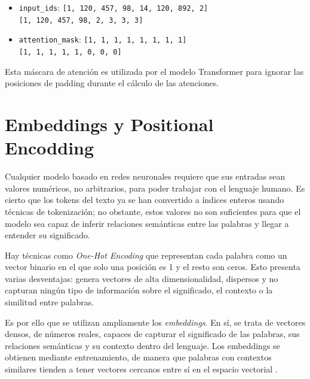 \documentclass[11pt]{book}
\begin{document}
\begin{itemize}
    \item \texttt{input\_ids}: \texttt{[1, 120, 457, 98, 14, 120, 892, 2]} \\
    \texttt{[1, 120, 457, 98, 2, 3, 3, 3]}
    \item \texttt{attention\_mask}: \texttt{[1, 1, 1, 1, 1, 1, 1, 1]} \\
    \texttt{[1, 1, 1, 1, 1, 0, 0, 0]}
\end{itemize}

Esta máscara de atención es utilizada por el modelo Transformer para ignorar las posiciones de padding durante el cálculo de las atenciones.

\text{\#\#\#\#\#\#\#\#\#\#\#\#\#\#\#\#\#\#\#\#\#\#\#\#\#\#\#\#\#\#\#\#\#}

\section{Embeddings y Positional Encodding}
Cualquier modelo basado en redes neuronales requiere que sus entradas sean valores numéricos, no arbitrarios, para poder trabajar con el lenguaje humano. Es cierto que los tokens del texto ya se han convertido a índices enteros usando técnicas de tokenización; no obstante, estos valores no son suficientes para que el modelo sea capaz de inferir relaciones semánticas entre las palabras y llegar a entender su significado.

Hay técnicas como  \textit{One-Hot Encoding} que representan cada palabra como un vector binario en el que solo una posición es 1 y el resto son ceros. Esto presenta varias desventajas: genera vectores de alta dimensionalidad, dispersos y no capturan ningún tipo de información sobre el significado, el contexto o la similitud entre palabras.

Es por ello que se utilizan ampliamente los \textit{embeddings}. En sí, se trata de vectores densos, de números reales, capaces de capturar el significado de las palabras, sus relaciones semánticas y su contexto dentro del lenguaje. Los embeddings se obtienen mediante entrenamiento, de manera que palabras con contextos similares tienden a tener vectores cercanos entre sí en el espacio vectorial \parencite{geeksforgeeks_embedding}.
\end{document}
